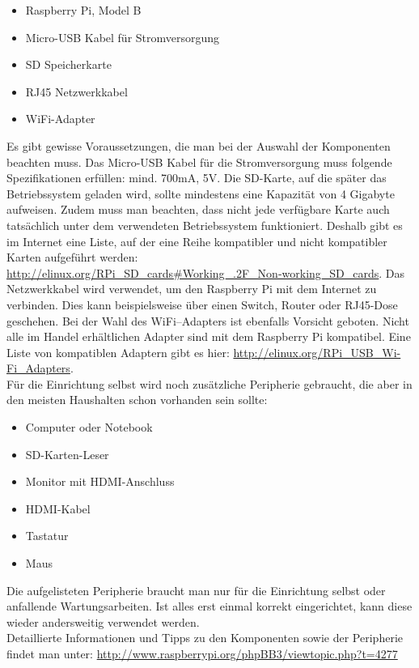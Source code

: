 \begin{itemize}
  \item Raspberry Pi, Model B
  \item Micro-USB Kabel für Stromversorgung
  \item SD Speicherkarte
  \item RJ45 Netzwerkkabel
  \item WiFi-Adapter
\end{itemize}

Es gibt gewisse Voraussetzungen, die man bei der Auswahl der Komponenten beachten muss. Das Micro-USB Kabel für die Stromversorgung muss folgende Spezifikationen erfüllen: mind. 700mA, 5V. Die SD-Karte, auf die später das Betriebssystem geladen wird, sollte mindestens eine Kapazität von 4 Gigabyte aufweisen. Zudem muss man beachten, dass nicht jede verfügbare Karte auch tatsächlich unter dem verwendeten Betriebssystem funktioniert. Deshalb gibt es im Internet eine Liste, auf der eine Reihe kompatibler und nicht kompatibler Karten aufgeführt werden: \url{http://elinux.org/RPi\_SD\_cards\#Working\_.2F\_Non-working\_SD\_cards}.
Das Netzwerkkabel wird verwendet, um den Raspberry Pi mit dem Internet zu verbinden. Dies kann beispielsweise über einen Switch, Router oder RJ45-Dose geschehen.
Bei der Wahl des WiFi--Adapters ist ebenfalls Vorsicht geboten. Nicht alle im Handel erhältlichen Adapter sind mit dem Raspberry Pi kompatibel. Eine Liste von kompatiblen Adaptern gibt es hier: \url{http://elinux.org/RPi_USB_Wi-Fi_Adapters}.
\\
Für die Einrichtung selbst wird noch zusätzliche Peripherie gebraucht, die aber in den meisten Haushalten schon vorhanden sein sollte:

\begin{itemize}
  \item Computer oder Notebook
  \item SD-Karten-Leser
  \item Monitor mit HDMI-Anschluss
  \item HDMI-Kabel
  \item Tastatur
  \item Maus
\end{itemize}

Die aufgelisteten Peripherie braucht man nur für die Einrichtung selbst oder anfallende Wartungsarbeiten.
Ist alles erst einmal korrekt eingerichtet, kann diese wieder andersweitig verwendet werden.
\\
Detaillierte Informationen und Tipps zu den Komponenten sowie der Peripherie findet man unter: \url{http://www.raspberrypi.org/phpBB3/viewtopic.php?t=4277}

